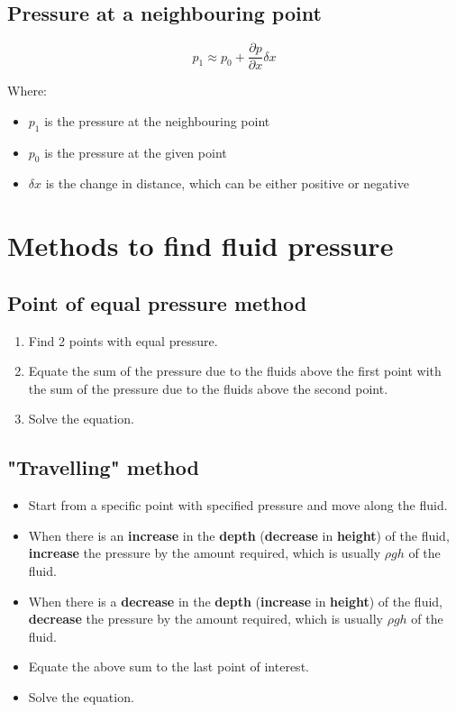 \documentclass[11pt]{article}
\begin{document}
\subsection{Pressure at a neighbouring point}
\label{sec:org2d4d6ad}
\[p_1 \approx p_0 + \frac{\partial p}{\partial x} \delta x\]

Where:
\begin{itemize}
\item \(p_1\) is the pressure at the neighbouring point
\item \(p_0\) is the pressure at the given point
\item \(\delta x\) is the change in distance, which can be either positive or negative
\end{itemize}

\newpage

\section{Methods to find fluid pressure}
\label{sec:org2f81388}

\subsection{Point of equal pressure method}
\label{sec:orgcc2f569}
\begin{enumerate}
\item Find 2 points with equal pressure.
\item Equate the sum of the pressure due to the fluids above the first point with the sum of the pressure due to the fluids above the second point.
\item Solve the equation.
\end{enumerate}

\subsection{"Travelling" method}
\label{sec:org27d0ef0}
\begin{itemize}
\item Start from a specific point with specified pressure and move along the fluid.
\item When there is an \textbf{increase} in the \textbf{depth} (\textbf{decrease} in \textbf{height}) of the fluid, \textbf{increase} the pressure by the amount required, which is usually \(\rho g h\) of the fluid.
\item When there is a \textbf{decrease} in the \textbf{depth} (\textbf{increase} in \textbf{height}) of the fluid, \textbf{decrease} the pressure by the amount required, which is usually \(\rho g h\) of the fluid.
\item Equate the above sum to the last point of interest.
\item Solve the equation.
\end{itemize}
\end{document}
